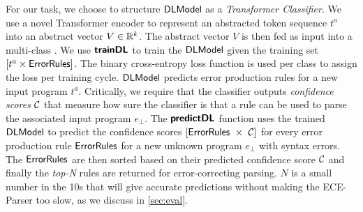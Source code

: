 

%

%
For our task, we choose to structure $\mathsf{DLModel}$ as a \emph{Transformer
Classifier}. We use a novel Transformer encoder to represent an abstracted token
sequence $t^a$ into an abstract vector $V \in \mathbb{R}^k$. The abstract vector $V$ is
then fed as input into a multi-class \dnn. We use $\bm{\mathsf{trainDL}}$ to train the
$\mathsf{DLModel}$ given the training set $[t^a \times \mathsf{ErrorRules}]$. The binary
cross-entropy loss function is used per class to assign the loss per training
cycle. $\mathsf{DLModel}$ predicts error production rules for a new input
program $t^a$. Critically, we require that the classifier outputs 
\emph{confidence scores} $\mathcal{C}$ that measure how
sure the classifier is that a rule can be used to parse the associated input
program $e_{\bot}$. The $\bm{\mathsf{predictDL}}$ function uses the trained $\mathsf{DLModel}$ to
predict the confidence scores $\List{\errorrulessym\ \times\ \Conf}$ for every
error production rule $\mathsf{ErrorRules}$ for a new unknown program $e_\bot$ with
syntax errors. The $\mathsf{ErrorRules}$ are then sorted based on their predicted
confidence score $\mathcal{C}$ and finally the \emph{top-N} rules are returned for
error-correcting parsing. $N$ is a small number in the 10s that will give
accurate predictions without making the ECE-Parser too slow, as we discuss in
\autoref{sec:eval}.
